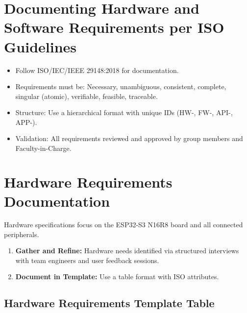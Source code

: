 \documentclass[12pt,a4paper]{article}
\begin{document}
\section*{Documenting Hardware and Software Requirements per ISO Guidelines}

\begin{itemize}[leftmargin=*]
\item Follow ISO/IEC/IEEE 29148:2018 for documentation.
\item Requirements must be: Necessary, unambiguous, consistent, complete,
      singular (atomic), verifiable, feasible, traceable.
\item Structure: Use a hierarchical format with unique IDs
      (HW-, FW-, API-, APP-).
\item Validation: All requirements reviewed and approved by group members
      and Faculty-in-Charge.
\end{itemize}

\newpage
\section*{Hardware Requirements Documentation}

Hardware specifications focus on the ESP32-S3 N16R8 board and all connected
peripherals.

\begin{enumerate}[leftmargin=*]
\item \textbf{Gather and Refine:} Hardware needs identified via structured
      interviews with team engineers and user feedback sessions.
\item \textbf{Document in Template:} Use a table format with ISO attributes.
\end{enumerate}

\subsection*{Hardware Requirements Template Table}
\end{document}
